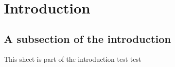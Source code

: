 \chapter{Introduction}

\section{A subsection of the introduction}

This sheet is part of the introduction test test